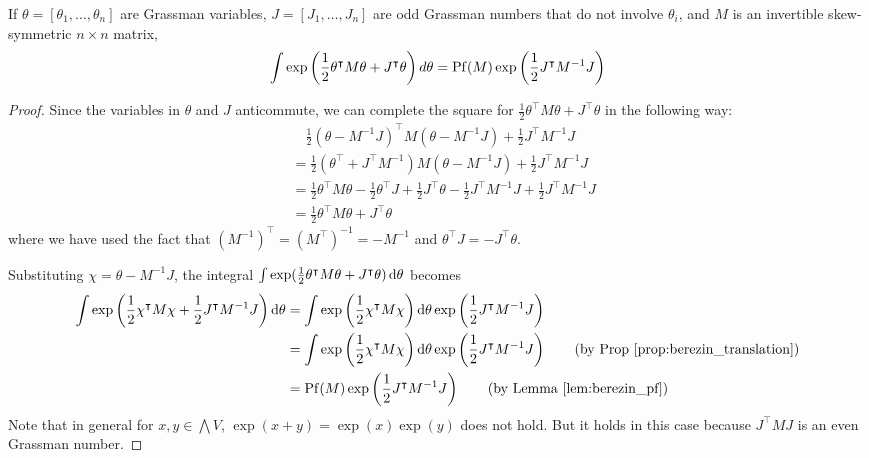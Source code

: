 \begin{prop} %
	If $\theta = [\theta_1,\ldots,\theta_n]$ are Grassman
	variables, $J= [J_1,\ldots,J_n]$ are odd Grassman numbers that do not
	involve $\theta_i$, and $M$ is an invertible skew-symmetric  $n\times n$ matrix,
	\[
	\int \exp\paren{\frac{1}{2}\theta^{\intercal}M\theta + J^\intercal\theta} d\theta =
	\Pf(M)\exp\paren{\frac{1}{2}J^\intercal M^{-1}J}
	\]
\end{prop}
\begin{proof}
	Since the variables in $\theta$ and $J$ anticommute, we can complete the
	square for  $\frac{1}{2}\theta^{\intercal}M\theta + J^\intercal\theta$ in
	the following way:
	\begin{align*}
		&\quad\frac{1}{2}(\theta-M^{-1}J)^\intercal M (\theta - M^{-1} J) + \frac{1}{2}
		J^\intercal M^{-1}J \\
		&=\frac{1}{2}(\theta^\intercal+J^\intercal M^{-1})M (\theta 
		- M^{-1} J) + \frac{1}{2} J^\intercal M^{-1}J \\
		&= \frac{1}{2}\theta^\intercal M \theta - \frac{1}{2} \theta^\intercal J
		+\frac{1}{2}J^\intercal \theta - \frac{1}{2}J^\intercal M^{-1} J +
		\frac{1}{2} J^\intercal M^{-1} J\\
		&= \frac{1}{2}\theta^\intercal M \theta + J^\intercal \theta 
	\end{align*}
	where we have used the fact that $(M^{-1})^\intercal = (M^\intercal)^{-1} =
	-M^{-1}$ and $\theta^\intercal J = - J^\intercal \theta$. 
	 
	Substituting $\chi = \theta - M^{-1}J$, the integral $\int
	\exp(\frac{1}{2}\theta^\intercal M\theta + J^\intercal\theta)\odif{\theta}$
	becomes
	\begin{align*}
	\int \exp\paren{\frac{1}{2}\chi^\intercal M \chi + \frac{1}{2}J^\intercal
	M^{-1} J}
	\odif{\theta}
	&= \int \exp\paren{\frac{1}{2}\chi^\intercal M \chi }
	\odif{\theta} \exp\paren{\frac{1}{2}J^\intercal M^{-1} J}	\\
	&= \int \exp\paren{\frac{1}{2}\chi^\intercal M \chi }
	\odif{\theta} \exp\paren{\frac{1}{2}J^\intercal M^{-1} J}\tag{by Prop
	\ref{prop:berezin_translation}}\\
	&= \Pf(M) \exp\paren{\frac{1}{2}J^\intercal M^{-1} J} \tag{by Lemma
	\ref{lem:berezin_pf}}
	\end{align*}
	Note that in general for $x,y\in\bigwedge V$, $\exp(x+y)=\exp(x)\exp(y)$
	does not hold. But it holds in this case because $J^\intercal M J$ is an even Grassman
	number. 	
\end{proof}
